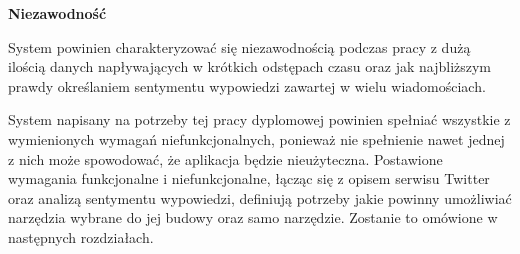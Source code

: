 \textbf{Niezawodność}

System powinien charakteryzować się niezawodnością podczas pracy z dużą ilością danych napływających w krótkich odstępach czasu oraz jak najbliższym prawdy określaniem sentymentu wypowiedzi zawartej w wielu wiadomościach.

System napisany na potrzeby tej pracy dyplomowej powinien spełniać wszystkie z wymienionych wymagań niefunkcjonalnych, ponieważ nie spełnienie nawet jednej z nich może spowodować, że aplikacja będzie nieużyteczna. Postawione wymagania funkcjonalne i niefunkcjonalne, łącząc się z opisem serwisu Twitter oraz analizą sentymentu wypowiedzi, definiują potrzeby jakie powinny umożliwiać narzędzia wybrane do jej budowy oraz samo narzędzie. Zostanie to omówione w następnych rozdziałach.

